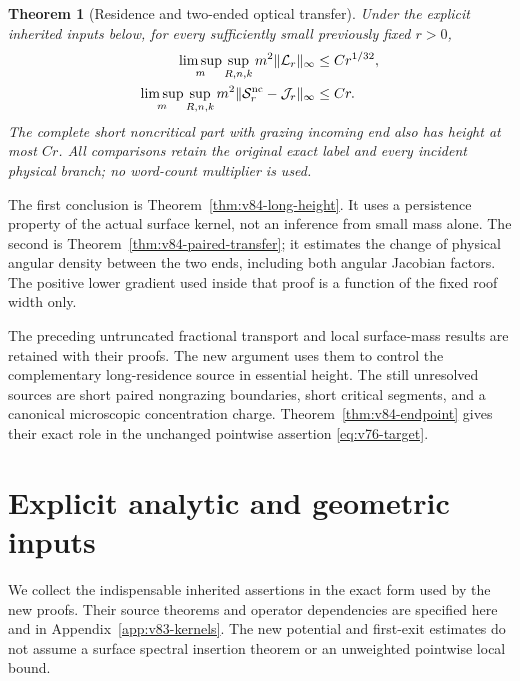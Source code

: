 \documentclass[11pt,reqno]{amsart}
\numberwithin{equation}{section}
\newtheorem{theorem}{Theorem}[section]
\theoremstyle{definition}\newtheorem{definition}[theorem]{Definition}
\theoremstyle{remark}\newtheorem{remark}[theorem]{Remark}
\theoremstyle{definition}\newtheorem{inputstatement}[theorem]{Input statement}
\begin{document}
\begin{theorem}[Residence and two-ended optical transfer]
\label{thm:v84-main}
Under the explicit inherited inputs below, for every sufficiently
small previously fixed $r>0$,
\begin{align}
 \limsup_m\sup_{R,n,k}m^2\|\mathcal L_r\|_\infty
                          &\le Cr^{1/32},\label{eq:v84-main-long}\\
 \limsup_m\sup_{R,n,k}m^2
       \|\mathcal S_r^{\rm nc}-\mathcal J_r\|_\infty
                          &\le Cr.\label{eq:v84-main-pair}
\end{align}
The complete short noncritical part with grazing incoming end also
has height at most $Cr$. All comparisons retain the original exact
label and every incident physical branch; no word-count multiplier
is used.
\end{theorem}
The first conclusion is Theorem~\ref{thm:v84-long-height}. It uses a
persistence property of the actual surface kernel, not an inference
from small mass alone. The second is
Theorem~\ref{thm:v84-paired-transfer}; it estimates the change of
physical angular density between the two ends, including both angular
Jacobian factors. The positive lower gradient used inside that proof
is a function of the fixed roof width only.

The preceding untruncated fractional transport and local surface-mass
results are retained with their proofs. The new argument uses them to
control the complementary long-residence source in essential height.
The still unresolved sources are short paired nongrazing boundaries,
short critical segments, and a canonical microscopic concentration
charge. Theorem~\ref{thm:v84-endpoint} gives their exact role in the
unchanged pointwise assertion \eqref{eq:v76-target}.

\section{Explicit analytic and geometric inputs}
We collect the indispensable inherited assertions in the exact form
used by the new proofs. Their source theorems and operator dependencies
are specified here and in Appendix~\ref{app:v83-kernels}. The new
potential and first-exit estimates do not assume a surface spectral
insertion theorem or an unweighted pointwise local bound.
\end{document}
